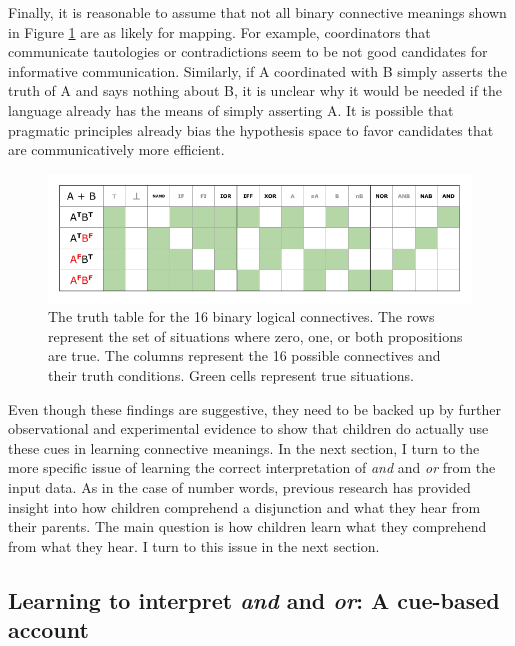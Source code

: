 \documentclass[floatsintext,man]{apa6}
\theoremstyle{definition}
\theoremstyle{definition}
\theoremstyle{definition}
\theoremstyle{remark}
\begin{document}
Finally, it is reasonable to assume that not all binary connective
meanings shown in Figure \ref{fig:binaryLogicalConnectivess} are as
likely for mapping. For example, coordinators that communicate
tautologies or contradictions seem to be not good candidates for
informative communication. Similarly, if A coordinated with B simply
asserts the truth of A and says nothing about B, it is unclear why it
would be needed if the language already has the means of simply
asserting A. It is possible that pragmatic principles already bias the
hypothesis space to favor candidates that are communicatively more
efficient.

\begin{figure}[tb]

{\centering \includegraphics{figs/binaryLogicalConnectivess-1} 

}

\caption{The truth table for the 16 binary logical connectives. The rows represent the set of situations where zero, one, or both propositions are true. The columns represent the 16 possible connectives and their truth conditions. Green cells represent true situations.}\label{fig:binaryLogicalConnectivess}
\end{figure}

Even though these findings are suggestive, they need to be backed up by
further observational and experimental evidence to show that children do
actually use these cues in learning connective meanings. In the next
section, I turn to the more specific issue of learning the correct
interpretation of \emph{and} and \emph{or} from the input data. As in
the case of number words, previous research has provided insight into
how children comprehend a disjunction and what they hear from their
parents. The main question is how children learn what they comprehend
from what they hear. I turn to this issue in the next section.

\subsection{\texorpdfstring{Learning to interpret \emph{and} and
\emph{or}: A cue-based
account}{Learning to interpret and and or: A cue-based account}}\label{myaccount}
\end{document}
